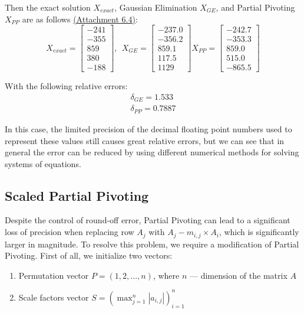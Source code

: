 \documentclass[letterpaper,12pt]{article}
\begin{document}
Then the exact solution $X_{exact}$, Gaussian Elimination $X_{GE}$, and Partial Pivoting $X_{PP}$ are as follows \hyperref[a:E4]{(Attachment 6.4)}:
\begin{equation}
    X_{exact} = 
    \begin{bmatrix}
        -241\\
        -355\\
        859\\
        380\\
        -188 
    \end{bmatrix}, \ \
    X_{GE} = 
    \begin{bmatrix}
         -237.0\\
         -356.2\\       
         859.1\\
         117.5\\
         1129
    \end{bmatrix}
    X_{PP} = 
    \begin{bmatrix}
         -242.7\\
         -353.3\\
         859.0\\
         515.0\\
         -865.5
    \end{bmatrix}
\end{equation}

With the following relative errors:
\begin{equation}
    \begin{array}{l}
         \delta_{GE} = 1.533\\
         \delta_{PP} = 0.7887
    \end{array}
\end{equation}

In this case, the limited precision of the decimal floating point numbers used to represent these values still causes great relative errors, but we can see that in general the error can be reduced by using different numerical methods for solving systems of equations.


\subsection{Scaled Partial Pivoting}

Despite the control of round-off error, Partial Pivoting can lead to a significant loss of precision when replacing row $A_j$ with $A_j - m_{i,j}\times A_i$, which is significantly larger in magnitude. To resolve this problem, we require a modification of Partial Pivoting. First of all, we initialize two vectors:
\begin{enumerate}
    \item Permutation vector $P = (1, 2, ... , n)$, where $n$ --- dimension of the matrix $A$
    \item Scale factors vector $S = (\displaystyle\max_{j=1}^n|a_{i,j}|)_{i=1}^n$
\end{enumerate}
\end{document}
